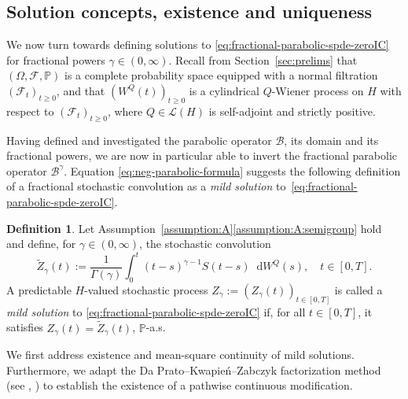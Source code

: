 \documentclass[reqno]{amsart}
\numberwithin{equation}{section}
\newcommand{\bbP}{\mathbb{P}}
\newcommand{\cB}{\mathcal{B}}
\newcommand{\cF}{\mathcal{F}}
\newcommand{\rd}{\mathop{}\!\mathrm{d}}
\theoremstyle{remark}
\theoremstyle{definition}
\newtheorem{definition}[lemma]{Definition}
\begin{document}
\subsection{Solution concepts, existence and uniqueness}
\label{subsec:analysis-zeroIC:solution-concepts}

We now turn towards defining solutions 
to \eqref{eq:fractional-parabolic-spde-zeroIC} 
for fractional powers $\gamma\in(0,\infty)$. 
Recall from Section~\ref{sec:prelims} 
that $(\Omega, \cF, \bbP)$ is a complete probability space  
equipped with a normal filtration $(\cF_t)_{t\geq 0}$,
and that $(W^Q(t))_{t\ge0}$ is a cylindrical $Q$-Wiener process  on $H$
with respect to $(\cF_t)_{t\geq 0}$,
where
$Q \in \mathscr L(H)$ is self-adjoint 
and strictly positive. 

Having defined and investigated the parabolic operator $\cB$, 
its domain and its fractional powers, 
we are now in particular able to invert 
the fractional parabolic operator $\cB^\gamma$\!.
Equation \eqref{eq:neg-parabolic-formula} suggests 
the following definition of a fractional stochastic convolution 
as a \emph{mild solution} 
to~\eqref{eq:fractional-parabolic-spde-zeroIC}. 

\begin{definition}\label{def:frac-mild-sol-zeroIC} 
	Let Assumption~\ref{assumption:A}\ref{assumption:A:semigroup} 
	hold and define, for $\gamma \in (0,\infty)$,
	the stochastic convolution 
	\begin{equation}\label{eq:stoch-conv} 
	\widetilde{Z}_\gamma(t)
	:=
	\frac{1}{\Gamma(\gamma)}
	\int_0^t 
	(t-s)^{\gamma-1} S(t-s)
	\rd W^Q(s), 
	\quad 
	t\in[0,T]. 
	\end{equation} 
	A predictable $H$-valued stochastic process 
	$Z_\gamma := (Z_\gamma(t))_{t\in[0,T]}$ is called a \emph{mild solution} 
	to \eqref{eq:fractional-parabolic-spde-zeroIC}  
	if, for all $t\in[0,T]$, it satisfies 
	$Z_\gamma(t) 
	=
	\widetilde{Z}_\gamma(t)$, 
	$\bbP$-a.s.
\end{definition} 

We first address 
existence and mean-square continuity 
of mild solutions. 
Furthermore, 
we adapt the  
Da Prato--Kwapie\'{n}--Zabczyk 
factorization method 
(see \cite{DaPratoKwapienZabczyk1987}, \cite[Section~5.3]{DaPrato2014}) 
to establish the existence of 
a pathwise continuous modification.  
\end{document}
